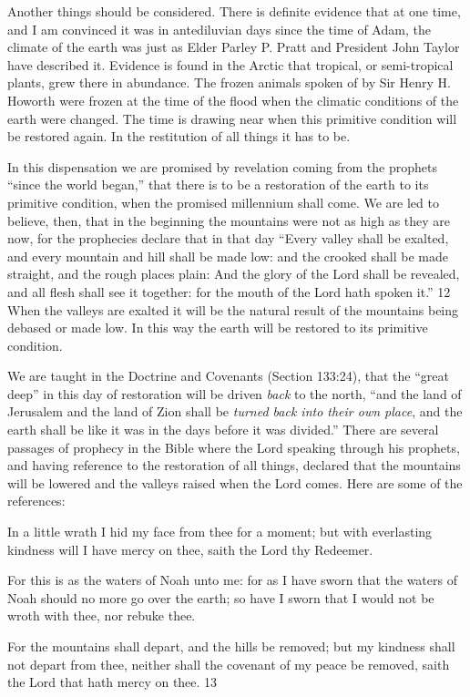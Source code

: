 Another things should be considered. There is definite evidence that at one time, and I am
convinced it was in antediluvian days since the time of Adam, the climate of the earth was
just as Elder Parley P. Pratt and President John Taylor have described it. Evidence is found in
the Arctic that tropical, or semi-tropical plants, grew there in abundance. The frozen animals
spoken of by Sir Henry H. Howorth were frozen at the time of the flood when the climatic
conditions of the earth were changed. The time is drawing near when this primitive condition
will be restored again. In the restitution of all things it has to be.

In this dispensation we are promised by revelation coming from the prophets ``since the
world began,'' that there is to be a restoration of the earth to its primitive condition, when the
promised millennium shall come. We are led to believe, then, that in the beginning the
mountains were not as high as they are now, for the prophecies declare that in that day
``Every valley shall be exalted, and every mountain and hill shall be made low: and the
crooked shall be made straight, and the rough places plain: And the glory of the Lord shall be
revealed, and all flesh shall see it together: for the mouth of the Lord hath spoken it.'' 12
When the valleys are exalted it will be the natural result of the mountains being debased or
made low. In this way the earth will be restored to its primitive condition.

We are taught in the Doctrine and Covenants (Section 133:24), that the ``great deep'' in this
day of restoration will be driven \textit{back} to the north, ``and the land of Jerusalem and the land of
Zion shall be \textit{turned back into their own place}, and the earth shall be like it was in the days
before it was divided.'' There are several passages of prophecy in the Bible where the Lord
speaking through his prophets, and having reference to the restoration of all things, declared
that the mountains will be lowered and the valleys raised when the Lord comes. Here are
some of the references:

In a little wrath I hid my face from thee for a moment; but with everlasting kindness will I
have mercy on thee, saith the Lord thy Redeemer.

For this is as the waters of Noah unto me: for as I have sworn that the waters of Noah should
no more go over the earth; so have I sworn that I would not be wroth with thee, nor rebuke
thee.

For the mountains shall depart, and the hills be removed; but my kindness shall not depart
from thee, neither shall the covenant of my peace be removed, saith the Lord that hath mercy
on thee. 13

